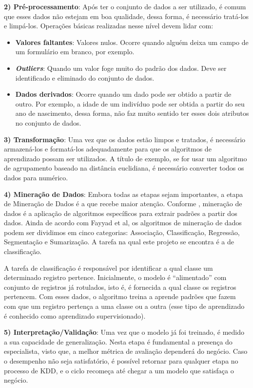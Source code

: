 \textbf{2) Pré-processamento}: Após ter o conjunto de dados a ser utilizado, é comum que esses dados não estejam em boa qualidade, dessa forma, é necessário tratá-los e limpá-los. Operações básicas realizadas nesse nível devem lidar com:

\begin{itemize}
    \item \textbf{Valores faltantes}: Valores nulos. Ocorre quando alguém deixa um campo de um formulário em branco, por exemplo.
    \item \textbf{\textit{Outliers}}: Quando um valor foge muito do padrão dos dados. Deve ser identificado e eliminado do conjunto de dados.
    \item \textbf{Dados derivados}: Ocorre quando um dado pode ser obtido a partir de outro. Por exemplo, a idade de um indivíduo pode ser obtida a partir do seu ano de nascimento, dessa forma, não faz muito sentido ter esses dois atributos no conjunto de dados.
\end{itemize}

\textbf{3) Transformação}: Uma vez que os dados estão limpos e tratados, é necessário armazená-los e formatá-los adequadamente para que os algoritmos de aprendizado possam ser utilizados. A título de exemplo, se for usar um algoritmo de agrupamento baseado na distância euclidiana, é necessário converter todos os dados para numérico.

\textbf{4) Mineração de Dados}:  Embora todas as etapas sejam importantes, a etapa de Mineração de Dados é a que recebe maior atenção. Conforme \cite{fayyad:1996}, mineração de dados é a aplicação de algoritmos específicos para extrair padrões a partir dos dados. Ainda de acordo com Fayyad et al, os algoritmos de mineração de dados podem ser dividimos em cinco categorias: Associação, Classificação, Regressão, Segmentação e Sumarização. A tarefa na qual este projeto se encontra é a de classificação. 

A tarefa de classificação é responsável por identificar a qual classe um determinado registro pertence. Inicialmente, o modelo é ``alimentado'' com conjunto de registros já rotulados, isto é, é fornecida a qual classe os registros pertencem. Com esses dados, o algoritmo treina a aprende padrões que fazem com que um registro pertença a uma classe ou a outra
(esse tipo de aprendizado é conhecido como aprendizado supervisionado).


\textbf{5) Interpretação/Validação}: Uma vez que o modelo já foi treinado, é medido a sua capacidade de generalização. Nesta etapa é fundamental a presença do especialista, visto que, a melhor métrica de avaliação dependerá do negócio. Caso o desempenho não seja satisfatório, é possível retornar para qualquer etapa no processo de KDD, e o ciclo recomeça até chegar a um modelo que satisfaça o negócio.





